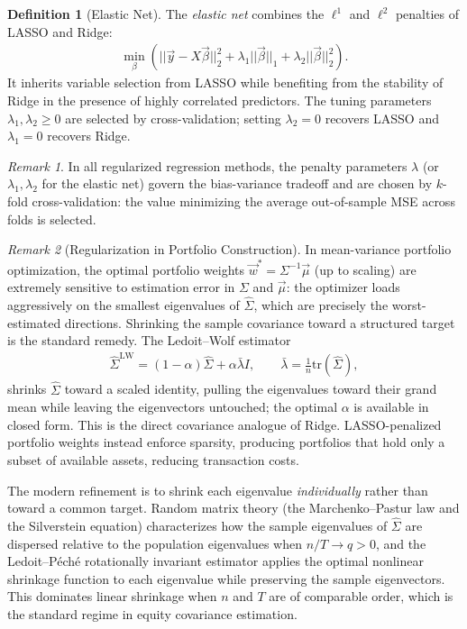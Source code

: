 \documentclass[11pt]{article}
\theoremstyle{definition}
\newtheorem{definition}{Definition}[section]
\theoremstyle{plain}
\theoremstyle{remark}
\newtheorem{remark}{Remark}[section]
\begin{document}
\begin{definition}[Elastic Net]
    The \textit{elastic net} combines the $\ell^1$ and $\ell^2$ penalties of LASSO and Ridge:
    \begin{align}
        \min_\beta\left(||\vec{y}-X\vec{\beta}||_2^2 + \lambda_1||\vec{\beta}||_1 + \lambda_2||\vec{\beta}||_2^2\right).
    \end{align}
    It inherits variable selection from LASSO while benefiting from the stability of Ridge in the presence of highly correlated predictors. The tuning parameters $\lambda_1, \lambda_2 \geq 0$ are selected by cross-validation; setting $\lambda_2 = 0$ recovers LASSO and $\lambda_1 = 0$ recovers Ridge.
\end{definition}

\begin{remark}
    In all regularized regression methods, the penalty parameters $\lambda$ (or $\lambda_1, \lambda_2$ for the elastic net) govern the bias-variance tradeoff and are chosen by $k$-fold cross-validation: the value minimizing the average out-of-sample MSE across folds is selected.
\end{remark}

\begin{remark}[Regularization in Portfolio Construction]
    In mean-variance portfolio optimization, the optimal portfolio weights $\vec{w}^* = \Sigma^{-1}\vec{\mu}$ (up to scaling) are extremely sensitive to estimation error in $\Sigma$ and $\vec{\mu}$: the optimizer loads aggressively on the smallest eigenvalues of $\hat{\Sigma}$, which are precisely the worst-estimated directions. Shrinking the sample covariance toward a structured target is the standard remedy. The Ledoit--Wolf estimator
    \begin{align}
        \hat{\Sigma}^{\mathrm{LW}} = (1-\alpha)\hat{\Sigma} + \alpha \bar{\lambda}I, \qquad \bar{\lambda} = \tfrac{1}{n}\mathrm{tr}(\hat{\Sigma}),
    \end{align}
    shrinks $\hat{\Sigma}$ toward a scaled identity, pulling the eigenvalues toward their grand mean while leaving the eigenvectors untouched; the optimal $\alpha$ is available in closed form. This is the direct covariance analogue of Ridge. LASSO-penalized portfolio weights instead enforce sparsity, producing portfolios that hold only a subset of available assets, reducing transaction costs.

    The modern refinement is to shrink each eigenvalue \emph{individually} rather than toward a common target. Random matrix theory (the Marchenko--Pastur law and the Silverstein equation) characterizes how the sample eigenvalues of $\hat{\Sigma}$ are dispersed relative to the population eigenvalues when $n/T \to q > 0$, and the Ledoit--P\'ech\'e rotationally invariant estimator applies the optimal nonlinear shrinkage function to each eigenvalue while preserving the sample eigenvectors. This dominates linear shrinkage when $n$ and $T$ are of comparable order, which is the standard regime in equity covariance estimation.
\end{remark}
\end{document}
